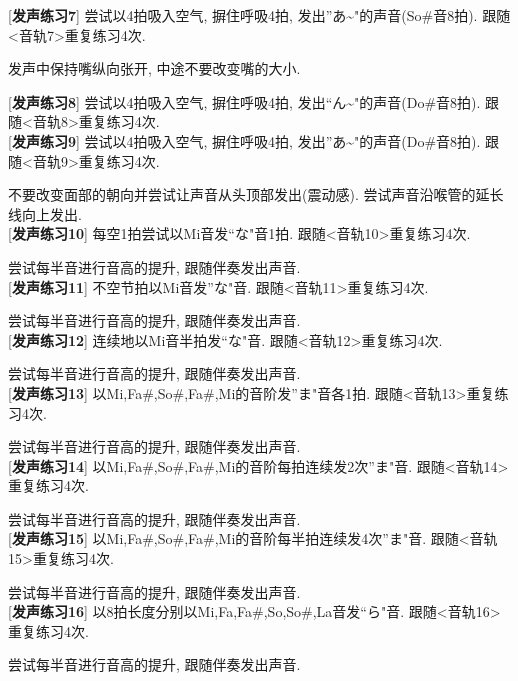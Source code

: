 [\textbf{发声练习7}] 尝试以4拍吸入空气, 摒住呼吸4拍, 发出''あ\textasciitilde"的声音(So\#音8拍). 跟随<音轨7>重复练习4次.\par
\qquad 发声中保持嘴纵向张开, 中途不要改变嘴的大小.\\

\clearpage

[\textbf{发声练习8}] 尝试以4拍吸入空气, 摒住呼吸4拍, 发出``ん\textasciitilde"的声音(Do\#音8拍). 跟随<音轨8>重复练习4次.\\

[\textbf{发声练习9}] 尝试以4拍吸入空气, 摒住呼吸4拍, 发出''あ\textasciitilde"的声音(Do\#音8拍). 跟随<音轨9>重复练习4次.\par
\qquad 不要改变面部的朝向并尝试让声音从头顶部发出(震动感). 尝试声音沿喉管的延长线向上发出.\\

[\textbf{发声练习10}] 每空1拍尝试以Mi音发``な"音1拍. 跟随<音轨10>重复练习4次.\par
\qquad 尝试每半音进行音高的提升, 跟随伴奏发出声音.\\

[\textbf{发声练习11}] 不空节拍以Mi音发''な"音. 跟随<音轨11>重复练习4次.\par
\qquad 尝试每半音进行音高的提升, 跟随伴奏发出声音.\\

[\textbf{发声练习12}] 连续地以Mi音半拍发``な"音. 跟随<音轨12>重复练习4次.\par
\qquad 尝试每半音进行音高的提升, 跟随伴奏发出声音.\\

[\textbf{发声练习13}] 以Mi,Fa\#,So\#,Fa\#,Mi的音阶发''ま"音各1拍. 跟随<音轨13>重复练习4次.\par
\qquad 尝试每半音进行音高的提升, 跟随伴奏发出声音.\\

[\textbf{发声练习14}] 以Mi,Fa\#,So\#,Fa\#,Mi的音阶每拍连续发2次''ま"音. 跟随<音轨14>重复练习4次.\par
\qquad 尝试每半音进行音高的提升, 跟随伴奏发出声音.\\

[\textbf{发声练习15}] 以Mi,Fa\#,So\#,Fa\#,Mi的音阶每半拍连续发4次''ま"音. 跟随<音轨15>重复练习4次.\par
\qquad 尝试每半音进行音高的提升, 跟随伴奏发出声音.\\

[\textbf{发声练习16}] 以8拍长度分别以Mi,Fa,Fa\#,So,So\#,La音发``ら"音. 跟随<音轨16>重复练习4次.\par
\qquad 尝试每半音进行音高的提升, 跟随伴奏发出声音.\\


